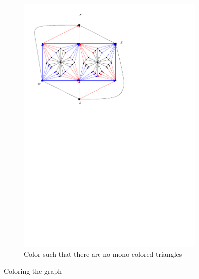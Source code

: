\begin{figure}[h]
\begin{subfigure}[t]{0.3\textwidth}
      \includegraphics[width=\textwidth]{fixExtension/img/manymany3}
      \caption{Color such that there are no mono-colored triangles}
      \label{fig:fix:manymany3}
    \end{subfigure}
    \caption{Coloring the graph}
    \label{fig:fix:coloring}
  \end{figure}




